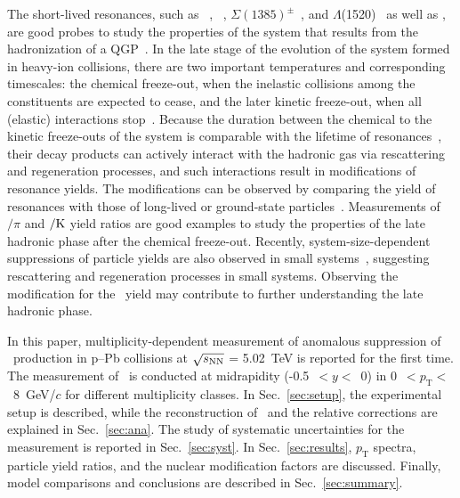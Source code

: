 The short-lived resonances, such as \rhoz~\cite{ALICE:2018qdv}, \kstar~\cite{ALICE:2019etb, ALICE:2016sak}, $\Sigma(1385)^{\pm}$~\cite{ALICE:2022zuc}, and $\Lambda$(1520)~\cite{ALICE:2018ewo} as well as \fzero, are good probes to study the properties of the system that results from the hadronization of a QGP~\cite{Bierlich:2021poz}. In the late stage of the evolution of the system formed in heavy-ion collisions, there are two important temperatures and corresponding timescales: the chemical freeze-out, when the inelastic collisions among the constituents are expected to cease, and the later kinetic freeze-out, when all (elastic) interactions stop~\cite{Song:1996ik}. Because the duration between the chemical to the kinetic freeze-outs of the system is comparable with the lifetime of resonances~\cite{ALICE:2011dyt, ALICE:2019xyr}, their decay products can actively interact with the hadronic gas via rescattering and regeneration processes, and such interactions result in modifications of resonance yields. The modifications can be observed by comparing the yield of resonances with those of long-lived or ground-state particles~\cite{ALICE:2018pal}. Measurements of \rhoz$/\pi$ and \kstar$\rm{}/K$ yield ratios are good examples to study the properties of the late hadronic phase after the chemical freeze-out. Recently, system-size-dependent suppressions of particle yields are also observed in small systems~\cite{ALICE:2019etb}, suggesting rescattering and regeneration processes in small systems. Observing the modification for the \fzero~yield may contribute to further understanding the late hadronic phase.

In this paper, multiplicity-dependent measurement of anomalous suppression of \fzero~production in p--Pb collisions at $\sqrt{s_{\rm NN}}$ = 5.02~TeV is reported for the first time. The measurement of \fzero~is conducted at midrapidity (-0.5~$<y<$~0) in 0~$<p_{\mathrm{T}}<$~8~GeV/$c$ for different multiplicity classes. In Sec.~\ref{sec:setup}, the experimental setup is described, while the reconstruction of \fzero\ and the relative corrections are explained in Sec.~\ref{sec:ana}. The study of systematic uncertainties for the measurement is reported in Sec.~\ref{sec:syst}. In Sec.~\ref{sec:results}, $p_{\mathrm{T}}$ spectra, particle yield ratios, and the nuclear modification factors are discussed. Finally, model comparisons and conclusions are described in Sec.~\ref{sec:summary}.

\label{sec:intro}




